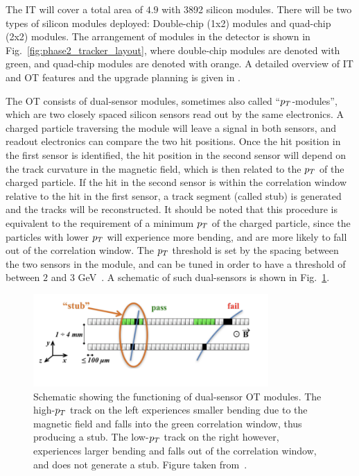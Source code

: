 The IT will cover a total area of $4.9$ \msq with 3892 silicon modules. There will be two types of silicon modules deployed:
Double-chip (1x2) modules and quad-chip (2x2) modules. The arrangement of modules in the detector is shown in Fig.~\ref{fig:phase2_tracker_layout},
where double-chip modules are denoted with green, and quad-chip modules are denoted with orange. A detailed overview of
IT and OT features and the upgrade planning is given in \cite{CMS:Phase2TrackerUpgrade}.

The OT consists of dual-sensor modules, sometimes also called ``$p_T$-modules'', which are two closely spaced silicon
sensors read out by the same electronics. A charged particle traversing the module will leave a signal in both sensors,
and readout electronics can compare the two hit positions. Once the hit position in the first sensor is identified,
the hit position in the second sensor will depend on the track curvature in the magnetic field, which is then related
to the $p_T$ of the charged particle. If the hit in the second sensor is within the correlation window relative to the
hit in the first sensor, a track segment (called stub) is generated and the tracks will be reconstructed. It should be
noted that this procedure is equivalent to the requirement of a minimum $p_T$ of the charged particle, since the particles with
lower $p_T$ will experience more bending, and are more likely to fall out of the correlation window. The $p_T$ threshold is
set by the spacing between the two sensors in the module, and can be tuned in order to have a threshold of between $2$ and $3$
GeV~\cite{CMS:Phase2TrackerUpgrade}. A schematic of such dual-sensors is shown in Fig.~\ref{fig:stub_ot_schematic}.

\begin{figure}[htbp]
    \centering
    \includegraphics[width=0.8\textwidth]{TrackerUpgrade/stub_ot_schematic.png}
    \caption{Schematic showing the functioning of dual-sensor OT modules. The high-$p_T$ track on the left
    experiences smaller bending due to the magnetic field and falls into the green correlation window, thus producing
    a stub. The low-$p_T$ track on the right however, experiences larger bending and falls out of the correlation
    window, and does not generate a stub. Figure taken from~\cite{CMS:TrackerUpgradeStatus}.}
    \label{fig:stub_ot_schematic}
\end{figure}

